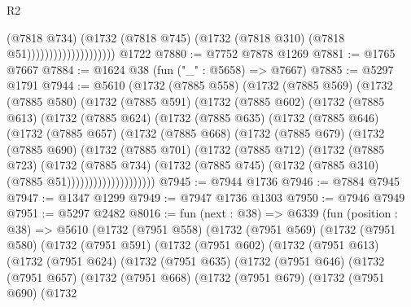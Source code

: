 \begin{lexlean}{R2}
\begin{coremodule}
                                      (@7818 @734)
                                      (@1732
                                        (@7818 @745)
                                        (@1732 (@7818 @310) (@7818 @51))))))))))))))))))))
    @1722
@7880 := @7752 @7878 @1269
@7881 := @1765 @7667
@7884 := @1624 @38 (fun ("_" : @5658) => @7667)
@7885 := @5297 @1791
@7944 := @5610
    (@1732
      (@7885 @558)
      (@1732
        (@7885 @569)
        (@1732
          (@7885 @580)
          (@1732
            (@7885 @591)
            (@1732
              (@7885 @602)
              (@1732
                (@7885 @613)
                (@1732
                  (@7885 @624)
                  (@1732
                    (@7885 @635)
                    (@1732
                      (@7885 @646)
                      (@1732
                        (@7885 @657)
                        (@1732
                          (@7885 @668)
                          (@1732
                            (@7885 @679)
                            (@1732
                              (@7885 @690)
                              (@1732
                                (@7885 @701)
                                (@1732
                                  (@7885 @712)
                                  (@1732
                                    (@7885 @723)
                                    (@1732
                                      (@7885 @734)
                                      (@1732
                                        (@7885 @745)
                                        (@1732 (@7885 @310) (@7885 @51))))))))))))))))))))
@7945 := @7944 @1736
@7946 := @7884 @7945
@7947 := @1347 @1299
@7949 := @7947 @1736 @1303
@7950 := @7946 @7949
@7951 := @5297 @2482
@8016 := fun (next : @38) =>
  @6339
    (fun (position : @38) =>
    @5610
      (@1732
        (@7951 @558)
        (@1732
          (@7951 @569)
          (@1732
            (@7951 @580)
            (@1732
              (@7951 @591)
              (@1732
                (@7951 @602)
                (@1732
                  (@7951 @613)
                  (@1732
                    (@7951 @624)
                    (@1732
                      (@7951 @635)
                      (@1732
                        (@7951 @646)
                        (@1732
                          (@7951 @657)
                          (@1732
                            (@7951 @668)
                            (@1732
                              (@7951 @679)
                              (@1732
                                (@7951 @690)
                                (@1732

\end{coremodule}
\end{lexlean}
